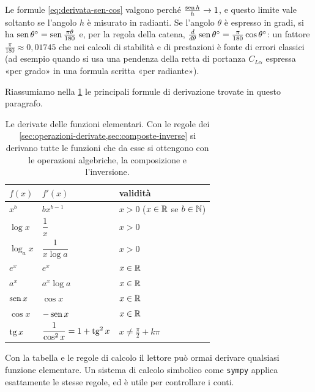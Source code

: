 \begin{attenzione}
Le formule \eqref{eq:derivata-sen-cos} valgono perché $\frac{\operatorname{sen} h}{h}\to1$, e questo
limite vale soltanto se l'angolo $h$ è misurato in radianti. Se l'angolo $\theta$ è
espresso in gradi, si ha $\operatorname{sen}\theta^{\circ}=\operatorname{sen}\frac{\pi\theta}{180}$ e, per la regola
della catena, $\frac{d}{d\theta}\operatorname{sen}\theta^{\circ}=\frac{\pi}{180}\cos\theta^{\circ}$: un
fattore $\frac\pi{180}\approx0{,}01745$ che nei calcoli di stabilità e di prestazioni è
fonte di errori classici (ad esempio quando si usa una pendenza della retta di portanza
$C_{L\alpha}$ espressa «per grado» in una formula scritta «per radiante»).
\end{attenzione}

Riassumiamo nella \cref{tab:derivate-elementari} le principali formule di derivazione
trovate in questo paragrafo.

\begin{table}[htb]
\centering
\renewcommand{\arraystretch}{1.45}
\begin{tabular}{l l l}
\toprule
$f(x)$ & $f'(x)$ & validità\\
\midrule
$x^{b}$ & $bx^{b-1}$ & $x>0$ ($x\in\mathbb{R}$ se $b\in\mathbb{N}$)\\
$\log x$ & $\dfrac1x$ & $x>0$\\
$\log_{a}x$ & $\dfrac1{x\log a}$ & $x>0$\\
$e^{x}$ & $e^{x}$ & $x\in\mathbb{R}$\\
$a^{x}$ & $a^{x}\log a$ & $x\in\mathbb{R}$\\
$\operatorname{sen} x$ & $\cos x$ & $x\in\mathbb{R}$\\
$\cos x$ & $-\operatorname{sen} x$ & $x\in\mathbb{R}$\\
$\operatorname{tg} x$ & $\dfrac1{\cos^{2}x}=1+\operatorname{tg}^{2}x$ & $x\neq\frac\pi2+k\pi$\\
\bottomrule
\end{tabular}
\caption{Le derivate delle funzioni elementari. Con le regole dei
\cref{sec:operazioni-derivate,sec:composte-inverse} si derivano tutte le funzioni che da
esse si ottengono con le operazioni algebriche, la composizione e l'inversione.}
\label{tab:derivate-elementari}
\end{table}

Con la tabella e le regole di calcolo il lettore può ormai derivare qualsiasi funzione
elementare. Un sistema di calcolo simbolico come \texttt{sympy} applica esattamente le
stesse regole, ed è utile per controllare i conti.

